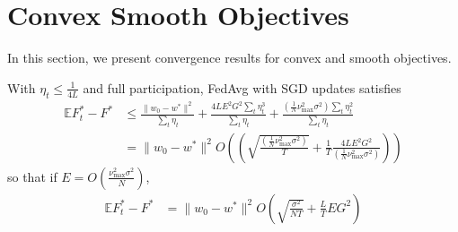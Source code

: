 


\section{Convex Smooth Objectives}

In this section, we present convergence results for convex and smooth objectives. 

\begin{theorem}
	With $\eta_{t}\leq\frac{1}{4L}$ and full participation, FedAvg with SGD updates satisfies
	\begin{align*}
	\mathbb{E}F_{t}^{\ast}-F^{\ast} & \leq\frac{\|w_{0}-w^{\ast}\|^{2}}{\sum_{t}\eta_{t}}+\frac{4LE^{2}G^{2}\sum_{t}\eta_{t}^{3}}{\sum_{t}\eta_{t}}+\frac{(\frac{1}{N}\nu_{\max}^{2}\sigma^{2})\sum_{t}\eta_{t}^{2}}{\sum_{t}\eta_{t}}\\
	& =\|w_{0}-w^{\ast}\|^{2}O((\sqrt{\frac{(\frac{1}{N}\nu_{\max}^{2}\sigma^{2})}{T}}+\frac{1}{T}\frac{4LE^{2}G^{2}}{(\frac{1}{N}\nu_{\max}^{2}\sigma^{2})}))
	\end{align*}
	so that if $E=O(\frac{\nu_{\max}^{2}\sigma^{2}}{N})$, 
	\begin{align*}
	\mathbb{E}F_{t}^{\ast}-F^{\ast} & =\|w_{0}-w^{\ast}\|^{2}O(\sqrt{\frac{\sigma^{2}}{NT}}+\frac{L}{T}EG^{2})
	\end{align*}
\end{theorem}

